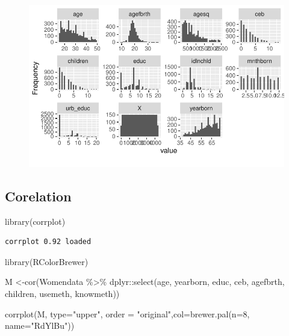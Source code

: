 \documentclass[
  letterpaper,
  DIV=11,
  numbers=noendperiod]{scrartcl}
\newenvironment{Shaded}{\begin{snugshade}}{\end{snugshade}}
\newcommand{\AttributeTok}[1]{\textcolor[rgb]{0.40,0.45,0.13}{#1}}
\newcommand{\DecValTok}[1]{\textcolor[rgb]{0.68,0.00,0.00}{#1}}
\newcommand{\FunctionTok}[1]{\textcolor[rgb]{0.28,0.35,0.67}{#1}}
\newcommand{\NormalTok}[1]{\textcolor[rgb]{0.00,0.23,0.31}{#1}}
\newcommand{\OtherTok}[1]{\textcolor[rgb]{0.00,0.23,0.31}{#1}}
\newcommand{\SpecialCharTok}[1]{\textcolor[rgb]{0.37,0.37,0.37}{#1}}
\newcommand{\StringTok}[1]{\textcolor[rgb]{0.13,0.47,0.30}{#1}}
\begin{document}
\begin{figure}[H]

{\centering \includegraphics{Fertility_Rates_Education_Impact_Botswana_files/figure-pdf/unnamed-chunk-31-1.pdf}

}

\end{figure}

\hypertarget{corelation}{%
\subsection{Corelation}\label{corelation}}

\begin{Shaded}
\begin{Highlighting}[]
\FunctionTok{library}\NormalTok{(corrplot)}
\end{Highlighting}
\end{Shaded}

\begin{verbatim}
corrplot 0.92 loaded
\end{verbatim}

\begin{Shaded}
\begin{Highlighting}[]
\FunctionTok{library}\NormalTok{(RColorBrewer)}

\NormalTok{M }\OtherTok{\textless{}{-}}\FunctionTok{cor}\NormalTok{(Womendata }\SpecialCharTok{\%\textgreater{}\%} 
\NormalTok{         dplyr}\SpecialCharTok{::}\FunctionTok{select}\NormalTok{(age, yearborn, educ, ceb, agefbrth, children, usemeth, knowmeth))}

\FunctionTok{corrplot}\NormalTok{(M, }\AttributeTok{type=}\StringTok{"upper"}\NormalTok{, }\AttributeTok{order =} \StringTok{"original"}\NormalTok{,}\AttributeTok{col=}\FunctionTok{brewer.pal}\NormalTok{(}\AttributeTok{n=}\DecValTok{8}\NormalTok{, }\AttributeTok{name=}\StringTok{"RdYlBu"}\NormalTok{))}
\end{Highlighting}
\end{Shaded}
\end{document}

